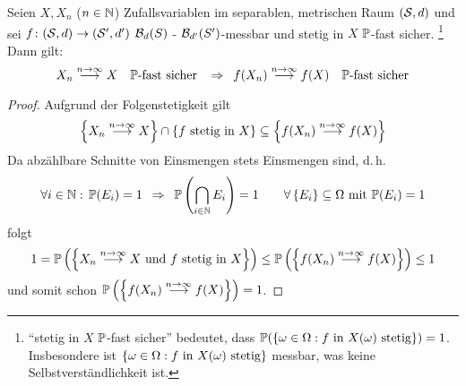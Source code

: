 \begin{satz} \label{satz: 3.8}
	Seien $X, X_n$ ($n \in \N$) Zufallsvariablen im separablen, metrischen Raum $(\S,d)$ und sei $f \colon (\S,d) \to (\S',d')$ $\B_d(S)$ - $\B_{d'}(S')$-messbar und stetig in $X$ $\P$-fast sicher.
	\footnote{\enquote{stetig in $X$ $\P$-fast sicher} bedeutet,
		dass $\P(\menge{\omega  \in  \Omega : f \text{ in } X(\omega) \text{ stetig}}) = 1$. Insbesondere ist $\menge{\omega  \in  \Omega : f \text{ in } X(\omega) \text{ stetig}}$ messbar, was keine Selbstverständlichkeit ist.}
	Dann gilt:
	\begin{equation*}
		X_n \ntoinf	X \quad \P\text{-fast sicher }
		\follows f(X_n) \ntoinf f(X) \quad \P\text{-fast sicher}
	\end{equation*}
\end{satz}

\begin{proof}
	Aufgrund der Folgenstetigkeit gilt
	\begin{equation*}
		\menge{X_n \ntoinf  X} \cap \menge{f \text{ stetig in }X}
		\subseteq
		\menge{f(X_n) \ntoinf f(X)}
	\end{equation*}
	Da abzählbare Schnitte von Einsmengen stets Einsmengen sind, d.\,h.
	\begin{equation*}
		\forall i \in \N : \, \P(E_i)=1
		\follows \P\brackets{\bigcap_{i \in \N} E_i}=1
		\qquad \forall \menge{E_i} \subseteq \Omega \mit \P(E_i)=1
	\end{equation*}
	folgt 
	\begin{equation*}
		1 = \P\brackets{\menge{X_n \ntoinf X \text{ und $f$ stetig in } X}} \le\P\brackets{\menge{f(X_n) \ntoinf  f(X)}} \le 1
	\end{equation*}
	und somit schon $\P\brackets{\menge{f(X_n) \ntoinf  f(X)}} = 1$.
\end{proof}

